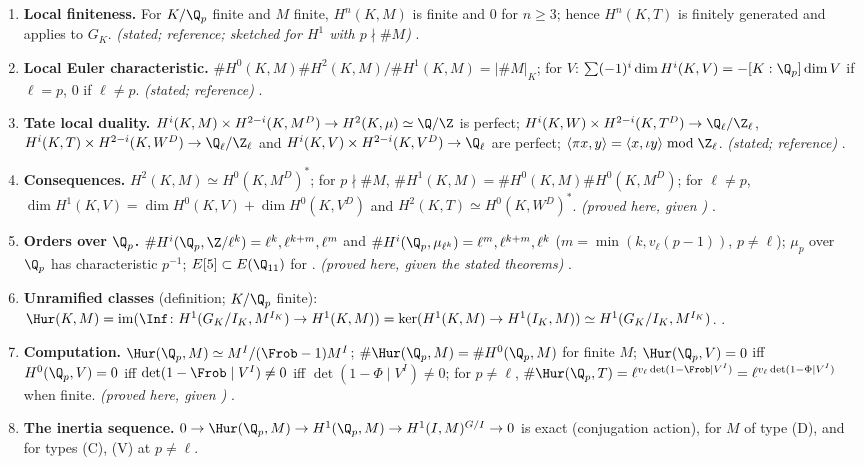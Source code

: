 \begin{sloppypar}
\begin{enumerate}[label=\textbf{\thechapter.\arabic*}]
\item \textbf{Local finiteness.} For $K/\Q_p$ finite and $M$ finite, $H^n(K,M)$ is finite and $0$ for $n\ge3$; hence $H^n(K,T)$ is finitely generated and 
applies to $G_K$. \emph{(stated; reference; sketched for $H^1$ with $p\nmid\#M$)} .
\item \textbf{Local Euler characteristic.} $\#H^0(K,M)\#H^2(K,M)/\#H^1(K,M)=|\#M|_K$; for $V$: $\sum(-1)^i\dim H^i(K,V)=-[K:\Q_p]\dim V$ if $\ell=p$, $0$ if $\ell\ne p$.
\emph{(stated; reference)} .
\item \textbf{Tate local duality.} $H^i(K,M)\times H^{2-i}(K,M^D)\to H^2(K,\mu)\simeq\Q/\Z$ is perfect; $H^i(K,W)\times H^{2-i}(K,T^D)\to\Q_\ell/\Z_\ell$, $H^i(K,T)\times H^{2-i}(K,W^D)\to\Q_\ell/\Z_\ell$ and
$H^i(K,V)\times H^{2-i}(K,V^D)\to\Q_\ell$ are perfect; $\langle\pi x,y\rangle=\langle x,\iota y\rangle\bmod\Z_\ell$. \emph{(stated; reference)} .
\item \textbf{Consequences.} $H^2(K,M)\simeq H^0(K,M^D)^*$; for $p\nmid\#M$, $\#H^1(K,M)=\#H^0(K,M)\#H^0(K,M^D)$; for $\ell\ne p$, $\dim H^1(K,V)=\dim H^0(K,V)+\dim H^0(K,V^D)$ and
$H^2(K,T)\simeq H^0(K,W^D)^*$. \emph{(proved here, given )} .
\item \textbf{Orders over $\Q_p$.} $\#H^i(\Q_p,\Z/\ell^k)=\ell^k,\ell^{k+m},\ell^m$ and $\#H^i(\Q_p,\mu_{\ell^k})=\ell^m,\ell^{k+m},\ell^k$ ($m=\min(k,v_\ell(p-1))$, $p\ne\ell$); $\mu_p$ over $\Q_p$ has
characteristic $p^{-1}$; $E[5]\subset E(\Q_{11})$ for . \emph{(proved here, given the stated theorems)} .
\item \textbf{Unramified classes} (definition; $K/\Q_p$ finite): $\Hur(K,M)=\operatorname{im}(\Inf\colon H^1(G_K/I_K,M^{I_K})\to H^1(K,M))=\ker(H^1(K,M)\to H^1(I_K,M))\simeq H^1(G_K/I_K,M^{I_K})$.
.
\item \textbf{Computation.} $\Hur(\Q_p,M)\simeq M^I/(\Frob-1)M^I$; $\#\Hur(\Q_p,M)=\#H^0(\Q_p,M)$ for finite $M$; $\Hur(\Q_p,V)=0$ iff $H^0(\Q_p,V)=0$ iff $\det(1-\Frob\mid V^I)\ne0$ iff
$\det(1-\Phi\mid V^I)\ne0$; for $p\ne\ell$, $\#\Hur(\Q_p,T)=\ell^{v_\ell\det(1-\Frob\mid V^I)}=\ell^{v_\ell\det(1-\Phi\mid V^I)}$ when finite. \emph{(proved here, given )}
.
\item \textbf{The inertia sequence.} $0\to\Hur(\Q_p,M)\to H^1(\Q_p,M)\to H^1(I,M)^{G/I}\to0$ is exact (conjugation action), for $M$ of type (D), and for types (C), (V) at $p\ne\ell$.

\end{enumerate}
\end{sloppypar}
